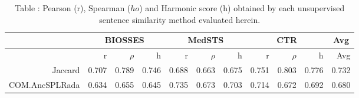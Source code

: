 

\begin{table}[!h]
\centering
\caption{Table \label{table:BioSentenceSimFinalRawOutputFiles}: Pearson (r), Spearman ($
ho$) and Harmonic score (h) obtained by each unsupervised sentence similarity method evaluated herein.} 
\begingroup\tiny
\begin{tabular}{rrrrrrrrrrr}
  \hline \multicolumn{1}{c}{ } & \multicolumn{3}{c}{BIOSSES} & \multicolumn{3}{c}{MedSTS} & \multicolumn{3}{c}{CTR} & \multicolumn{1}{c}{Avg} \\  \hline
 & r & $\rho$ & h & r & $\rho$ & h & r & $\rho$ & h & Avg \\ 
  \hline
Jaccard & 0.707 & 0.789 & 0.746 & 0.688 & 0.663 & 0.675 & 0.751 & 0.803 & 0.776 & 0.732 \\ 
  COM.AncSPLRada & 0.634 & 0.655 & 0.645 & 0.735 & 0.673 & 0.703 & 0.714 & 0.672 & 0.692 & 0.680 \\ 
   \hline
\end{tabular}
\endgroup
\end{table}
